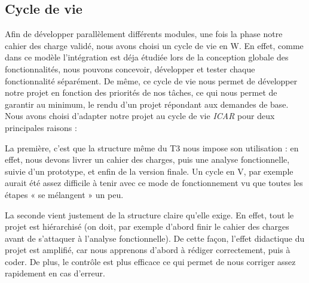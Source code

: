 \subsection{Cycle de vie}
Afin de développer parallèlement différents modules, une fois la phase notre cahier des charge validé, nous avons choisi un cycle de vie en W. 
En effet, comme dans ce modèle l'intégration est déja étudiée lors de la conception globale des fonctionnalités, nous pouvons concevoir, développer et tester chaque fonctionnalité séparément. 
De même, ce cycle de vie nous permet de développer notre projet en fonction des priorités de nos tâches, ce qui nous permet de garantir au minimum, le rendu d'un projet répondant aux demandes de base.
Nous avons choisi d'adapter notre projet au cycle de vie \emph{ICAR} pour deux principales raisons : 

La première, c'est que la structure même du T3 nous impose son utilisation :
en effet, nous devons livrer un cahier des charges, puis une analyse fonctionnelle, suivie d'un prototype, et enfin de la version finale. 
Un cycle en V, par exemple aurait été assez difficile à tenir avec ce mode de fonctionnement vu que toutes les étapes « se mélangent » un peu. 

La seconde vient justement de la structure claire qu'elle exige. 
En effet, tout le projet est hiérarchisé (on doit, par exemple d'abord finir le cahier des charges avant de s'attaquer à l'analyse fonctionnelle). 
De cette façon, l'effet didactique du projet est amplifié, car nous apprenons d'abord à rédiger correctement, puis à coder. 
De plus, le contrôle est plus efficace ce qui permet de nous corriger assez rapidement en cas d'erreur.
